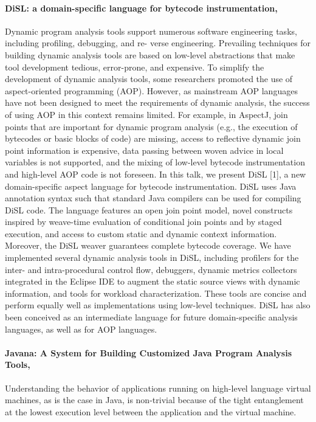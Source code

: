 \paragraph{DiSL: a domain-specific language for bytecode instrumentation, \cite{Marek:2012:DEL:2162037.2162046,Marek2012}}
Dynamic program analysis tools support numerous software engineering tasks, including profiling, debugging, and re-
verse engineering.
Prevailing techniques for building dynamic analysis tools are based on low-level abstractions
that make tool development tedious, error-prone, and expensive. To simplify the development of dynamic analysis tools,
some researchers promoted the use of aspect-oriented programming (AOP). However, as mainstream AOP languages
have not been designed to meet the requirements of dynamic analysis, the success of using AOP in this context remains
limited. For example, in AspectJ, join points that are important for dynamic program analysis (e.g., the execution of
bytecodes or basic blocks of code) are missing, access to reflective dynamic join point information is expensive, data
passing between woven advice in local variables is not supported, and the mixing of low-level bytecode instrumentation
and high-level AOP code is not foreseen. In this talk, we present DiSL [1], a new domain-specific aspect language for
bytecode instrumentation.
DiSL uses Java annotation syntax such that standard Java compilers can be used for compiling
DiSL code. The language features an open join point model, novel constructs inspired by weave-time evaluation of
conditional join points and by staged execution, and access to custom static and dynamic context information.
Moreover, the DiSL weaver guarantees complete bytecode coverage.
We have implemented several dynamic analysis tools in DiSL,
including profilers for the inter- and intra-procedural control
flow, debuggers, dynamic metrics collectors integrated in the
Eclipse IDE to augment the static source views with dynamic information, and tools for workload characterization.
These tools are concise and perform equally well as implementations using low-level techniques. DiSL has also been
conceived as an intermediate language for future domain-specific analysis languages, as well as for AOP languages.

\paragraph{Javana: A System for Building Customized Java Program Analysis Tools, \cite{Maebe06javana:a}}
Understanding the behavior of applications running on high-level
language virtual machines, as is the case in Java, is non-trivial because of the tight entanglement at the lowest execution level between the application and the virtual machine.

